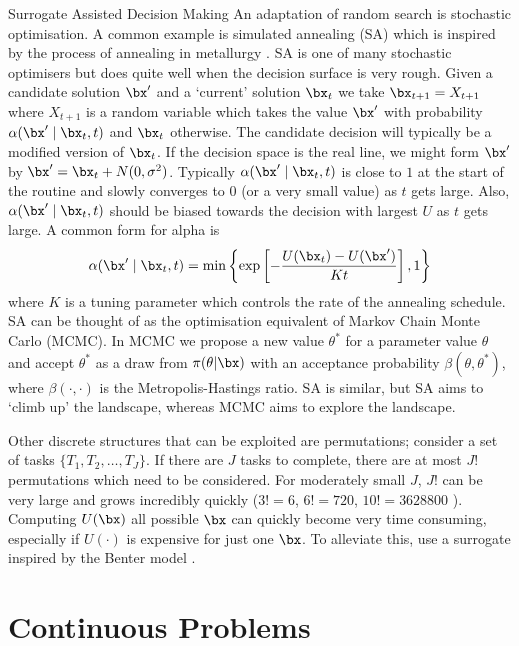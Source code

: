 \begin{chapter}{Surrogate Assisted Decision Making \label{Chap:optimisation}}
An adaptation of random search is stochastic optimisation. A common example is simulated annealing (SA) which is inspired by the process of annealing in metallurgy \citep{Schneider2006}. SA is one of many stochastic optimisers but does quite well when the decision surface is very rough. Given a candidate solution $\bx'$ and a `current' solution $\bx_t$ we take $\bx_{t+1} = X_{t+1}$ where $X_{t+1}$ is a random variable which takes the value $\bx'$ with probability $\alpha( \bx' \mid \bx_{t}, t)$ and $\bx_t$ otherwise. The candidate decision will typically be a modified version of $\bx_t$. If the decision space is the real line, we might form $\bx'$ by $\bx' = \bx_t + N(0, \sigma^2)$.  Typically $\alpha(\bx' \mid \bx_{t}, t)$ is close to $1$ at the start of the routine and slowly converges to $0$ (or a very small value) as $t$ gets large. Also, $\alpha(\bx' \mid \bx_{t}, t)$ should be biased towards the decision with largest $U$ as $t$ gets large. A common form for alpha is
\begin{equation}
  \alpha(\bx' \mid \bx_{t}, t) = \min \left\{  \exp\left[-\frac{U(\bx_t) - U(\bx')}{Kt}\right], 1\right\}
\end{equation}
where $K$ is a tuning parameter which controls the rate of the annealing schedule. SA can be thought of as the optimisation equivalent of Markov Chain Monte Carlo (MCMC). In MCMC we propose a new value $\theta^{*}$ for a parameter value $\theta$ and accept $\theta^{*}$ as a draw from $\pi(\theta |\bx)$ with an acceptance probability $\beta(\theta, \theta^{*})$, where $\beta(\cdot, \cdot)$ is the Metropolis-Hastings ratio. SA is similar, but SA aims to `climb up' the landscape, whereas MCMC aims to explore the landscape.


Other discrete structures that can be exploited are permutations; consider a set of tasks $\{T_1, T_2, \ldots, T_J\}$. If there are $J$ tasks to complete, there are at most $J!$ permutations which need to be considered. For moderately small $J$, $J!$ can be very large and grows incredibly quickly ($3! = 6$, $6! = 720$, $10! = 3628800$ ). Computing $U(\bx)$ all possible $\bx$ can quickly become very time consuming, especially if $U(\cdot)$ is expensive for just one $\bx$. To alleviate this, \citet{Wilson2018} use a surrogate inspired by the Benter model \citep{Benter1994}.

\section{Continuous Problems}


\end{chapter}
